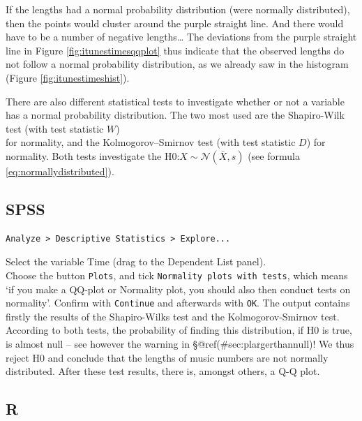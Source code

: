 \documentclass[
]{book}
\newenvironment{Shaded}{\begin{snugshade}}{\end{snugshade}}
\newcommand{\AttributeTok}[1]{\textcolor[rgb]{0.77,0.63,0.00}{#1}}
\newcommand{\CommentTok}[1]{\textcolor[rgb]{0.56,0.35,0.01}{\textit{#1}}}
\newcommand{\ConstantTok}[1]{\textcolor[rgb]{0.00,0.00,0.00}{#1}}
\newcommand{\DecValTok}[1]{\textcolor[rgb]{0.00,0.00,0.81}{#1}}
\newcommand{\FunctionTok}[1]{\textcolor[rgb]{0.00,0.00,0.00}{#1}}
\newcommand{\NormalTok}[1]{#1}
\newcommand{\OtherTok}[1]{\textcolor[rgb]{0.56,0.35,0.01}{#1}}
\newcommand{\SpecialCharTok}[1]{\textcolor[rgb]{0.00,0.00,0.00}{#1}}
\newcommand{\StringTok}[1]{\textcolor[rgb]{0.31,0.60,0.02}{#1}}
\begin{document}
If the lengths had a normal probability distribution (were normally
distributed), then the points would cluster around the purple straight line. And there would have to be a number of negative lengths\ldots{} The deviations from the purple straight line in
Figure \ref{fig:itunestimesqqplot} thus indicate that the observed lengths
do not follow a normal probability distribution, as we already saw in the
histogram (Figure \ref{fig:itunestimeshist}).

There are also different statistical tests to investigate whether or not a variable
has a normal probability distribution. The two most used are the
Shapiro-Wilk test (with test statistic \(W\))\\
for normality, and the Kolmogorov--Smirnov test (with test statistic \(D\)) for
normality. Both tests investigate the
H0:\(X\sim\mathcal{N}(\bar{X},s)\) (see
formula \eqref{eq:normallydistributed}).

\hypertarget{spss-4}{%
\subsection{SPSS}\label{spss-4}}

\begin{verbatim}
Analyze > Descriptive Statistics > Explore...
\end{verbatim}

Select the variable Time (drag to the Dependent List panel).\\
Choose the button \texttt{Plots}, and tick \texttt{Normality\ plots\ with\ tests}, which
means `if you make a QQ-plot or Normality plot, you should also then conduct
tests on normality'.
Confirm with \texttt{Continue} and afterwards with \texttt{OK}. The output contains
firstly the results of the Shapiro-Wilks test and the
Kolmogorov-Smirnov test. According to both tests, the probability of finding
this distribution, if H0 is true, is almost null -- see however the
warning in
§@ref(\#sec:plargerthannull)! We thus reject H0 and conclude that
the lengths of music numbers are not normally distributed. After these
test results, there is, amongst others, a Q-Q plot.

\hypertarget{r-6}{%
\subsection{R}\label{r-6}}

\begin{Shaded}
\end{Shaded}
\end{document}
